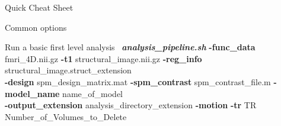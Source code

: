 \documentclass[]{article}
\begin{document}
\begin{section}{Quick Cheat Sheet}
\begin{subsection}{Common options}
\end{subsection}
\begin{subsection}{Run a basic first level analysis}
\
{\it \bf analysis\_pipeline.sh}   {\bf -func\_data} fmri\_4D.nii.gz  {\bf -t1} structural\_image.nii.gz  {\bf -reg\_info} structural\_image.struct\_extension   \\
\hspace*{1.3in} {\bf -design} spm\_design\_matrix.mat  {\bf -spm\_contrast}  spm\_contrast\_file.m  {\bf -model\_name} name\_of\_model   \\
\hspace*{1.3in} {\bf -output\_extension} analysis\_directory\_extension  {\bf -motion}  {\bf -tr} TR  \\
\hspace*{1.3in}{\bf -deleteVolumes} Number\_of\_Volumes\_to\_Delete
\end{subsection}

\end{section}
\end{document}
